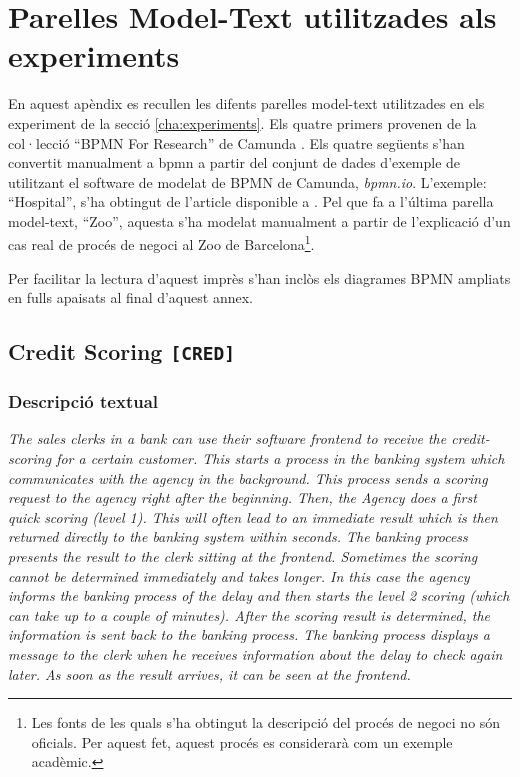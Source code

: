 \clearpage
\appendix
\chapter{Parelles Model-Text utilitzades als experiments}
\label{sec:parelles_model_text}

En aquest apèndix es recullen les difents parelles model-text utilitzades en els experiment de la secció \ref{cha:experiments}. Els quatre primers provenen de la col·lecció ``BPMN For Research'' de Camunda \cite{camunda_models}. Els quatre següents s'han convertit manualment a bpmn a partir del conjunt de dades d'exemple de \cite{text2process_models} utilitzant el software de modelat de BPMN de Camunda, \emph{bpmn.io}. L'exemple: ``Hospital'', s'ha obtingut de l'article disponible a \cite{hospital_ref}. Pel que fa a l'última parella model-text, ``Zoo'', aquesta s'ha modelat manualment a partir de l'explicació d'un cas real de procés de negoci al Zoo de Barcelona\footnote{Les fonts de les quals s'ha obtingut la descripció del procés de negoci no són oficials. Per aquest fet, aquest procés es considerarà com un exemple acadèmic.}.

Per facilitar la lectura d'aquest imprès s'han inclòs els diagrames BPMN ampliats en fulls apaisats al final d'aquest annex.

\clearpage
\section{Credit Scoring \texttt{[CRED]} }

\subsection*{Descripció textual}

\textit{The sales clerks in a bank can use their software frontend to receive the credit-scoring for a certain customer. This starts a process in the banking system which communicates with the agency in the background. This process sends a scoring request to the agency right after the beginning. Then, the Agency does a first quick scoring (level 1). This will often lead to an immediate result which is then returned directly to the banking system within seconds. The banking process presents the result to the clerk sitting at the frontend. Sometimes the scoring cannot be determined immediately and takes longer. In this case the agency informs the banking process of the delay and then starts the level 2 scoring (which can take up to a couple of minutes). After the scoring result is determined, the information is sent back to the banking process. The banking process displays a message to the clerk when he receives information about the delay to check again later. As soon as the result arrives, it can be seen at the frontend.}

